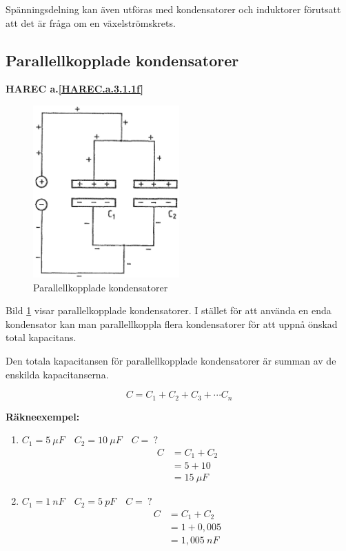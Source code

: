 Spänningsdelning kan även utföras med kondensatorer och induktorer förutsatt att
det är fråga om en växelströmskrets.

\subsection{Parallellkopplade kondensatorer}
\textbf{HAREC a.\ref{HAREC.a.3.1.1f}\label{myHAREC.a.3.1.1f}}

\begin{figure}[ht]
\begin{center}
  \includegraphics[width=0.5\textwidth]{images/cropped_pdfs/bild_2_3-05.pdf}
  \caption{Parallellkopplade kondensatorer}
  \label{fig:BildII3-05}
\end{center}
\end{figure}

Bild \ref{fig:BildII3-05} visar parallelkopplade kondensatorer.
I stället för att använda en enda kondensator kan man parallellkoppla flera
kondensatorer för att uppnå önskad total kapacitans.

Den totala kapacitansen för parallellkopplade kondensatorer är summan av de
enskilda kapacitanserna.

\[C = C_1 + C_2 + C_3 + \cdots C_n\]

\textbf{Räkneexempel:}
\begin{enumerate}
\item \(C_1 = 5\ \mu F \quad C_2 = 10\ \mu F \quad C =\ ?\)
  \begin{align*}
    C &= C_1 + C_2 \\
    &= 5 + 10 \\
    &= 15\ \mu F
  \end{align*}
\item \(C_1 = 1\ nF \quad C_2 = 5\ pF \quad C =\ ?\)
  \begin{align*}
    C &= C_1 + C_2 \\
    &= 1 + 0,005 \\
    &= 1,005\ nF
  \end{align*}
\end{enumerate}

